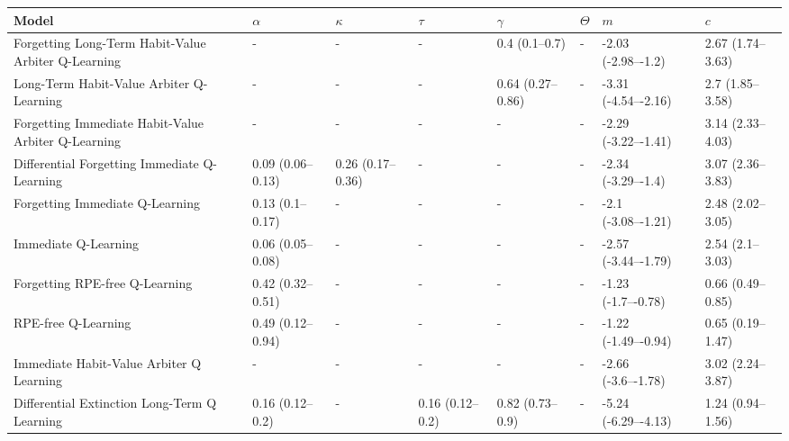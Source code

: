 \begin{tabular}{llllllll}
\toprule
                                                           Model &         $\alpha$ &         $\kappa$ &           $\tau$ &         $\gamma$ &         $\Theta$ &                 $m$ &              $c$ \\
\midrule
             Forgetting Long-Term Habit-Value Arbiter Q-Learning &                - &                - &                - &    0.4 (0.1–0.7) &                - &  -2.03 (-2.98–-1.2) & 2.67 (1.74–3.63) \\
                        Long-Term Habit-Value Arbiter Q-Learning &                - &                - &                - & 0.64 (0.27–0.86) &                - & -3.31 (-4.54–-2.16) &  2.7 (1.85–3.58) \\
             Forgetting Immediate Habit-Value Arbiter Q-Learning &                - &                - &                - &                - &                - & -2.29 (-3.22–-1.41) & 3.14 (2.33–4.03) \\
                    Differential Forgetting Immediate Q-Learning & 0.09 (0.06–0.13) & 0.26 (0.17–0.36) &                - &                - &                - &  -2.34 (-3.29–-1.4) & 3.07 (2.36–3.83) \\
                                 Forgetting Immediate Q-Learning &  0.13 (0.1–0.17) &                - &                - &                - &                - &  -2.1 (-3.08–-1.21) & 2.48 (2.02–3.05) \\
                                            Immediate Q-Learning & 0.06 (0.05–0.08) &                - &                - &                - &                - & -2.57 (-3.44–-1.79) &  2.54 (2.1–3.03) \\
                                  Forgetting RPE-free Q-Learning & 0.42 (0.32–0.51) &                - &                - &                - &                - &  -1.23 (-1.7–-0.78) & 0.66 (0.49–0.85) \\
                                             RPE-free Q-Learning & 0.49 (0.12–0.94) &                - &                - &                - &                - & -1.22 (-1.49–-0.94) & 0.65 (0.19–1.47) \\
                        Immediate Habit-Value Arbiter Q Learning &                - &                - &                - &                - &                - &  -2.66 (-3.6–-1.78) & 3.02 (2.24–3.87) \\
                    Differential Extinction Long-Term Q Learning &  0.16 (0.12–0.2) &                - &  0.16 (0.12–0.2) &  0.82 (0.73–0.9) &                - & -5.24 (-6.29–-4.13) & 1.24 (0.94–1.56) \\

\end{tabular}

